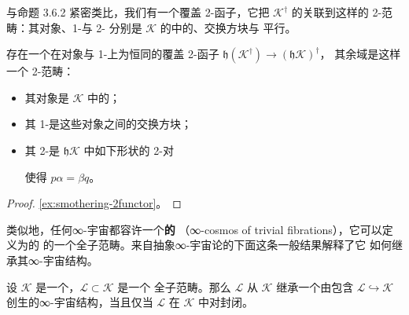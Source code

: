 与命题 3.6.2 紧密类比，我们有一个覆盖 2-函子，它把 $\mathcal{K}^{\dagger}$
的\trHomotopyTwoCategory{}关联到这样的 2-范畴：其对象、1-\trCell{}与 2-\trCell{}%
分别是 $\mathcal{K}$ 的\trHomotopyTwoCategory{}中的\trIsofibration、交换方块与
平行\trNaturalTransformation。

\begin{lemma}\label{lem:smothering-2functor}
存在一个在对象与 1-\trCell{}上为恒同的覆盖 2-函子
$\mathfrak{h}(\mathcal{K}^{\dagger})\to(\mathfrak{h}\mathcal{K})^{\dagger}$，
其余域是这样一个 2-范畴：
\begin{itemize}
\item 其对象是 $\mathcal{K}$ 中的\trIsofibration；
\item 其 1-\trCell{}是这些对象之间的交换方块；
\item 其 2-\trCell{}是 $\mathfrak{h}\mathcal{K}$ 中如下形状的 2-\trCell{}对
\begin{center}
\end{center}
使得 $p\alpha=\beta q$。
\end{itemize}
\end{lemma}

\begin{proof}
\cref{ex:smothering-2functor}。
\end{proof}

类似地，任何∞-宇宙都容许一个\textbf{\trTrivialFibration{}的\trInfinityCosmos}
（∞-cosmos of trivial fibrations），它可以定义为\trIsofibration{}的%
\trInfinityCosmos{}的一个全子范畴。来自抽象∞-宇宙论的下面这条一般结果解释了它
如何继承其∞-宇宙结构。

\begin{lemma}\label{lem:full-subcategory-cosmos}
设 $\mathcal{K}$ 是一个\trInfinityCosmos{}，$\mathcal{L}\subset\mathcal{K}$ 是一个
全子范畴。那么 $\mathcal{L}$ 从 $\mathcal{K}$ 继承一个由包含
$\mathcal{L}\hookrightarrow\mathcal{K}$ 创生的∞-宇宙结构，当且仅当 $\mathcal{L}$
在 $\mathcal{K}$ 中对\trCosmologicalLimitNotions{}封闭。
\end{lemma}

